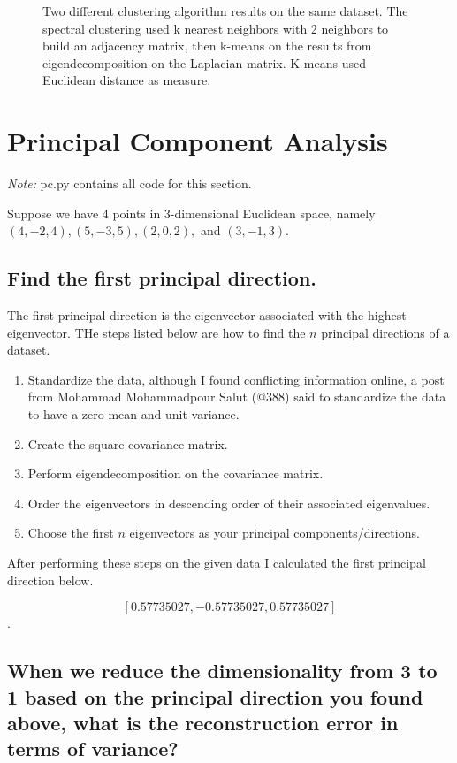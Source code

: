 \documentclass[a4paper]{article}
\begin{document}
\begin{figure}[h]
    \caption{Two different clustering algorithm results on the same dataset.  The spectral clustering used k nearest neighbors with 2 neighbors to build an adjacency matrix, then k-means on the results from eigendecomposition on the Laplacian matrix.  K-means used Euclidean distance as measure. }\label{clusterCompare}
\end{figure}



\section{Principal Component Analysis}
\textit{Note:} pc.py contains all code for this section.

Suppose we have 4 points in 3-dimensional Euclidean space, namely $(4, −2, 4), (5, −3, 5),
(2, 0, 2),$ and $(3, −1, 3).$

\subsection{Find the first principal direction.}

The first principal direction is the eigenvector associated with the highest eigenvector.  THe steps listed below are how to find the $n$ principal directions of a dataset.

\begin{enumerate}
\item Standardize the data, although I found conflicting information online, a post from  Mohammad Mohammadpour Salut (@388) said to standardize the data to have a zero mean and unit variance.
\item Create the square covariance matrix.
\item Perform eigendecomposition on the covariance matrix.
\item Order the eigenvectors in descending order of their associated eigenvalues.
\item Choose the first $n$ eigenvectors as your principal components/directions.
\end{enumerate}

After performing these steps on the given data I calculated the first principal direction below. 

$$[ 0.57735027, -0.57735027,  0.57735027]$$.

\subsection{When we reduce the dimensionality from 3 to 1 based on the principal direction you found above, what is the reconstruction error in terms of variance?}
\end{document}
